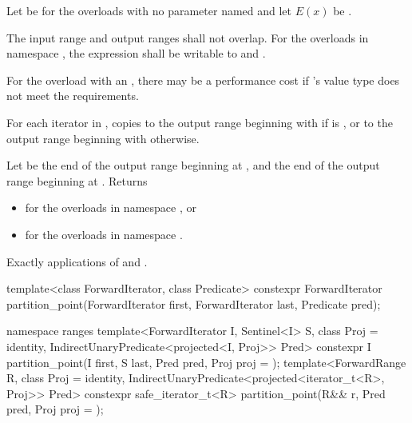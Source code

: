 \begin{itemdescr}
\pnum
Let  be 
for the overloads with no parameter named  and
let $E(x)$ be .

\pnum
\requires
The input range and output ranges shall not overlap.
For the overloads in namespace ,
the expression 
shall be writable
to  and .
\begin{note}
For the overload with an ,
there may be a performance cost if 's value type
does not meet the  requirements.
\end{note}

\pnum
\effects
For each iterator  in ,
copies  to the output range beginning with 
if  is , or
to the output range beginning with  otherwise.

\pnum
\returns
Let  be the end of the output range beginning at ,
and  the end of the output range beginning at .
Returns
\begin{itemize}
\item {} for the overloads in namespace , or
\item {} for the overloads in namespace .
\end{itemize}

\pnum
\complexity
Exactly  applications of  and .
\end{itemdescr}

%
\begin{itemdecl}
template<class ForwardIterator, class Predicate>
  constexpr ForwardIterator
    partition_point(ForwardIterator first, ForwardIterator last, Predicate pred);

namespace ranges {
  template<ForwardIterator I, Sentinel<I> S, class Proj = identity,
           IndirectUnaryPredicate<projected<I, Proj>> Pred>
    constexpr I partition_point(I first, S last, Pred pred, Proj proj = {});
  template<ForwardRange R, class Proj = identity,
           IndirectUnaryPredicate<projected<iterator_t<R>, Proj>> Pred>
    constexpr safe_iterator_t<R>
      partition_point(R&& r, Pred pred, Proj proj = {});
}
\end{itemdecl}

